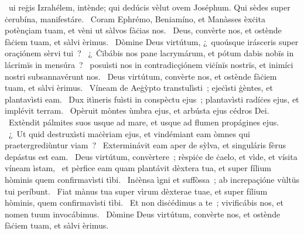 \psalmChapterWithInscription{}
{ }
{%
~ui reġis Izrahélem, intènde; qui dedúcis vèlut ovem Joséphum. Qui sèdes super ċerubína, manifestáre. 
~Coram Ephrémo, Beniamíno, et Manàsses èxċita potènçiam tuam, et vèni ut sàlvos fàċias nos. 
~Deus, convèrte nos, et ostènde fàċiem tuam, et sàlvi èrimus. 
~Dòmine Deus virtútum, ¿~quoúsque irásceris super oraçiónem sèrvi tui~? 
~¿~Ċibábis nos pane lacrymárum, et pótum dabis nobïs in lácrimïs in mensúra~? 
~posuìsti nos in contradicçiónem viċínïs nostrïs, et inimíci nostri subsannavérunt nos. 
~Deus virtútum, convèrte nos, et ostènde fàċiem tuam, et sàlvi èrimus. 
~Víneam de Aeġỳpto transtulìsti~; ejeċìsti ġèntes, et plantavìsti eam. 
~Dux itìneris fuìsti in conspèctu ejus~; plantavìsti radíċes ejus, et implévit terram. 
~Opèruit mòntes ùmbra ejus, et arbústa ejus cédros Dei. 
~Extèndit pálmites suos usque ad mare, et usque ad flumen propágines ejus. 
~¿~Ut quid destruxìsti maċèriam ejus, et vindémiant eam òmnes qui praetergrediùntur viam~? 
~Exterminávit eam aper de sỳlva, et singuláris fèrus depástus est eam. 
~Deus virtútum, convèrtere~; rèspiċe de ċaelo, et vìde, et vísita víneam ìstam, 
~et pèrfice eam quam plantávit dèxtera tua, et super fílium hòminis quem confirmavìsti tìbi. 
~Inċènsa ìgni et suffòssa~; ab increpaçióne vùltüs tui períbunt. 
~Fiat mànus tua super vìrum dèxterae tuae, et super fílium hòminis, quem confirmavìsti tìbi. 
~Et non disċédimus a te~; vivificábis nos, et nomen tuum invocábimus. 
~Dòmine Deus virtútum, convèrte nos, et ostènde fàċiem tuam, et sàlvi èrimus. 
}
